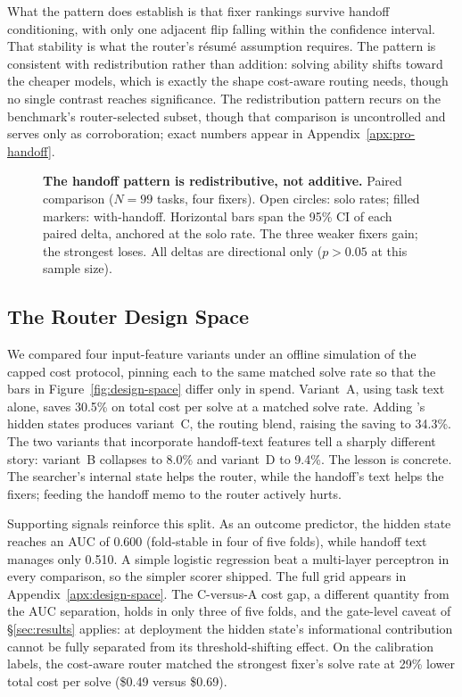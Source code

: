 What the pattern does establish is that fixer rankings survive handoff conditioning, with only one adjacent flip falling within the confidence interval.
That stability is what the router's r\'{e}sum\'{e} assumption requires.
The pattern is consistent with redistribution rather than addition: solving ability shifts toward the cheaper models, which is exactly the shape cost-aware routing needs, though no single contrast reaches significance.
The redistribution pattern recurs on the benchmark's router-selected subset, though that comparison is uncontrolled and serves only as corroboration; exact numbers appear in Appendix~\ref{apx:pro-handoff}.

\begin{figure}[!tbp]
  \centering
  
  \caption{\textbf{The handoff pattern is redistributive, not additive.}
  Paired comparison ($N{=}99$ tasks, four fixers).  Open circles: solo
  rates; filled markers: with-handoff.  Horizontal bars span the 95\%
  CI of each paired delta, anchored at the solo rate.  The three weaker
  fixers gain; the strongest loses.  All deltas are directional only
  ($p>0.05$ at this sample size).}
  \label{fig:redistribution}
\end{figure}

\subsection{The Router Design Space}
\label{sec:calib-design}

We compared four input-feature variants under an offline simulation of the capped cost protocol, pinning each to the same matched solve rate so that the bars in Figure~\ref{fig:design-space} differ only in spend.
Variant~A, using task text alone, saves 30.5\% on total cost per solve at a matched solve rate.
Adding \modelname's hidden states produces variant~C, the routing blend, raising the saving to 34.3\%.
The two variants that incorporate handoff-text features tell a sharply different story: variant~B collapses to 8.0\% and variant~D to 9.4\%.
The lesson is concrete.
The searcher's internal state helps the router, while the handoff's text helps the fixers; feeding the handoff memo to the router actively hurts.

Supporting signals reinforce this split.
As an outcome predictor, the hidden state reaches an AUC of 0.600 (fold-stable in four of five folds), while handoff text manages only 0.510.
A simple logistic regression beat a multi-layer perceptron in every comparison, so the simpler scorer shipped.
The full grid appears in Appendix~\ref{apx:design-space}.
The C-versus-A cost gap, a different quantity from the AUC separation,
holds in only three of five folds, and the gate-level caveat of \S\ref{sec:results} applies: at deployment the hidden state's informational contribution cannot be fully separated from its threshold-shifting effect.
On the calibration labels, the cost-aware router matched the strongest fixer's solve rate at 29\% lower total cost per solve (\$0.49 versus \$0.69).

